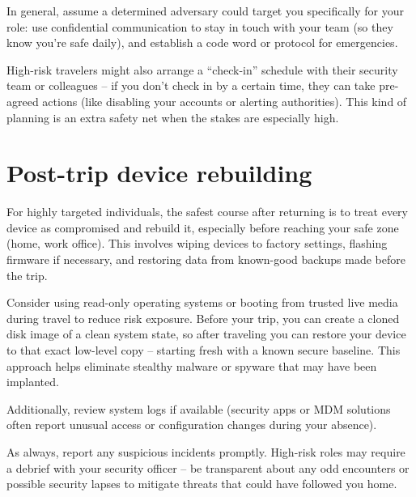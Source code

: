 In general, assume a determined adversary could target you
specifically for your role: use confidential communication
to stay in touch with your team (so they know you're safe
daily), and establish a code word or protocol for
emergencies.

High-risk travelers might also arrange a ``check-in''
schedule with their security team or colleagues -- if you
don't check in by a certain time, they can take pre-agreed
actions (like disabling your accounts or alerting
authorities). This kind of planning is an extra safety net
when the stakes are especially high.

\section{Post-trip device rebuilding}

For highly targeted individuals, the safest course after
returning is to treat every device as compromised and
rebuild it, especially before reaching your safe zone
(home, work office). This involves wiping devices to
factory settings, flashing firmware if necessary, and
restoring data from known-good backups made before the
trip.

Consider using read-only operating systems or booting from
trusted live media during travel to reduce risk exposure.
Before your trip, you can create a cloned disk image of a
clean system state, so after traveling you can restore
your device to that exact low-level copy -- starting fresh
with a known secure baseline. This approach helps
eliminate stealthy malware or spyware that may have been
implanted.

Additionally, review system logs if available (security
apps or MDM solutions often report unusual access or
configuration changes during your absence).

As always, report any suspicious incidents promptly.
High-risk roles may require a debrief with your security
officer -- be transparent about any odd encounters or
possible security lapses to mitigate threats that could
have followed you home.

